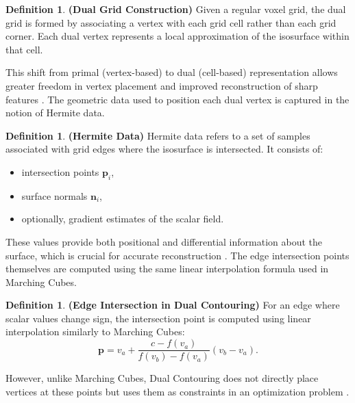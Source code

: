 \documentclass[12pt, a4paper, oneside]{book}
\theoremstyle{plain}
\theoremstyle{definition}
\newtheorem{definition}[theorem]{Definition}
\theoremstyle{remark}
\theoremstyle{definition}
\begin{document}
\vspace{0.5em}

\begin{definition}
    \textbf{(Dual Grid Construction)}
Given a regular voxel grid, the dual grid is formed by associating a vertex with each
grid cell rather than each grid corner. Each dual vertex represents a local approximation
of the isosurface within that cell.
\end{definition}

This shift from primal (vertex-based) to dual (cell-based) representation allows greater
freedom in vertex placement and improved reconstruction of sharp features \cite{ju2002dual}.
The geometric data used to position each dual vertex is captured in the notion of Hermite
data.

\vspace{0.5em}

\begin{definition}
    \textbf{(Hermite Data)}
Hermite data refers to a set of samples associated with grid edges where the isosurface
is intersected. It consists of:
\begin{itemize}
    \item intersection points $\mathbf{p}_i$,
    \item surface normals $\mathbf{n}_i$,
    \item optionally, gradient estimates of the scalar field.
\end{itemize}
\end{definition}

These values provide both positional and differential information about the surface, which
is crucial for accurate reconstruction \cite{ju2002dual,kobbelt2001feature}. The edge
intersection points themselves are computed using the same linear interpolation formula
used in Marching Cubes.

\vspace{0.5em}

\begin{definition}
    \textbf{(Edge Intersection in Dual Contouring)}
For an edge where scalar values change sign, the intersection point is computed using
linear interpolation similarly to Marching Cubes:
\[
\mathbf{p} = v_a + \frac{c - f(v_a)}{f(v_b) - f(v_a)} (v_b - v_a).
\]
\end{definition}

However, unlike Marching Cubes, Dual Contouring does not directly place vertices at these
points but uses them as constraints in an optimization problem \cite{ju2002dual}.
\end{document}
